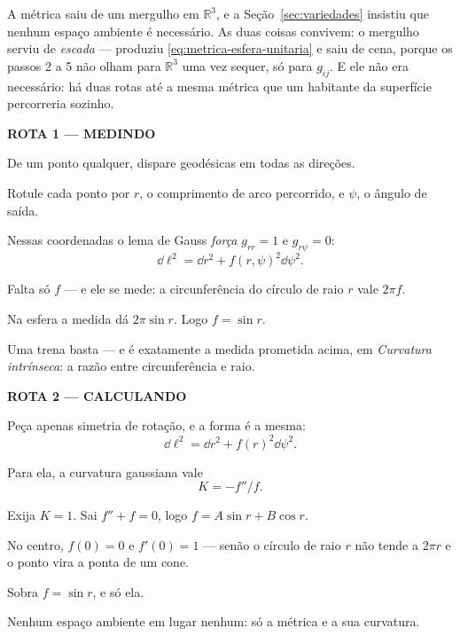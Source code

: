 \documentclass[12pt,a4paper,oneside]{book}
\theoremstyle{rgplain}
\theoremstyle{rgremark}
\begin{document}
\begin{infografico}[title={\sffamily\bfseries\footnotesize\color{rgPetroleo}A
MESMA MÉTRICA, SEM SAIR DA SUPERFÍCIE}]
A métrica saiu de um mergulho em $\mathbb{R}^3$, e a
Seção~\ref{sec:variedades} insistiu que nenhum espaço ambiente é
necessário. As duas coisas convivem: o mergulho serviu de \emph{escada} ---
produziu \eqref{eq:metrica-esfera-unitaria} e saiu de cena, porque os
passos 2 a 5 não olham para $\mathbb{R}^3$ uma vez sequer, só para
$g_{ij}$. E ele não era necessário: há duas rotas até a mesma métrica que
um habitante da superfície percorreria sozinho.

\medskip
\noindent
\begin{minipage}[t]{0.465\linewidth}
\textcolor{rgPetroleo}{\sffamily\bfseries\footnotesize ROTA 1 --- MEDINDO}
\begin{etapas}
  \item De um ponto qualquer, dispare geodésicas em todas as direções.
  \item Rotule cada ponto por $r$, o comprimento de arco percorrido, e
  $\psi$, o ângulo de saída.
  \item Nessas coordenadas o lema de Gauss \emph{força}
  $g_{rr}=1$ e $g_{r\psi}=0$:
  \[ \dd\ell^2=\dd r^2+f(r,\psi)^2\dd\psi^2 . \]
  \item Falta só $f$ --- e ele se mede: a circunferência do círculo de raio
  $r$ vale $2\pi f$.
  \item Na esfera a medida dá $2\pi\sin r$. Logo $f=\sin r$.
\end{etapas}
\medskip
Uma trena basta --- e é exatamente a medida prometida acima, em
\emph{Curvatura intrínseca}: a razão entre circunferência e raio.
\end{minipage}\hfill
\begin{minipage}[t]{0.465\linewidth}
\textcolor{rgPetroleo}{\sffamily\bfseries\footnotesize ROTA 2 --- CALCULANDO}
\begin{etapas}
  \item Peça apenas simetria de rotação, e a forma é a mesma:
  \[ \dd\ell^2=\dd r^2+f(r)^2\dd\psi^2 . \]
  \item Para ela, a curvatura gaussiana vale
  \[ K=-f''/f . \]
  \item Exija $K=1$. Sai $f''+f=0$, logo $f=A\sin r+B\cos r$.
  \item No centro, $f(0)=0$ e $f'(0)=1$ --- senão o círculo de raio $r$ não
  tende a $2\pi r$ e o ponto vira a ponta de um cone.
  \item Sobra $f=\sin r$, e só ela.
\end{etapas}
\medskip
Nenhum espaço ambiente em lugar nenhum: só a métrica e a sua curvatura.
\end{minipage}


\end{infografico}
\end{document}
